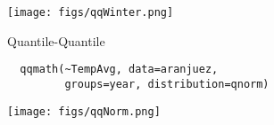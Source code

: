 \documentclass[aspectratio=169, usenames,svgnames,dvipsnames]{beamer}
\begin{document}
\begin{frame}[label={sec:org5a7cb01}]{}
\begin{center}
\texttt{[image: figs/qqWinter.png]}
\end{center}
\end{frame}

\begin{frame}[label={sec:org2604b37},fragile]{Quantile-Quantile}
 \lstset{language=r,label= ,caption= ,captionpos=b,numbers=none}
\begin{lstlisting}
  qqmath(~TempAvg, data=aranjuez,
         groups=year, distribution=qnorm)
\end{lstlisting}
\end{frame}

\begin{frame}[label={sec:org4170d35}]{}
\begin{center}
\texttt{[image: figs/qqNorm.png]}
\end{center}
\end{frame}
\end{document}
